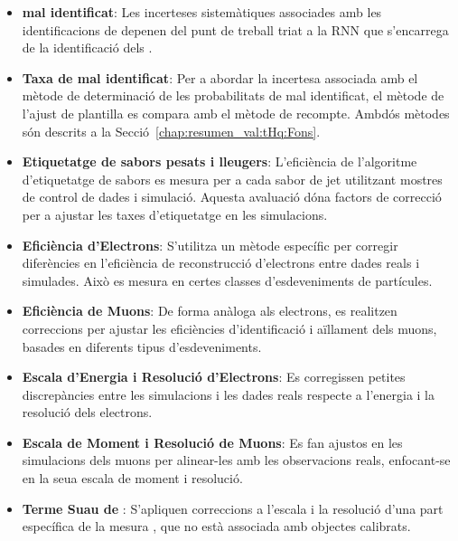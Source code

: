 \begin{itemize}
	\item \textbf{\tauhad mal identificat}: Les incerteses sistemàtiques associades amb les identificacions de \tauhad 
	depenen del punt de treball triat a la RNN que s'encarrega de la identificació dels \tauhad.%


	\item \textbf{Taxa de \tauhad mal identificat}: Per a abordar la incertesa associada amb el mètode
	de determinació de les probabilitats de \tauhad mal identificat, el mètode de l'ajust de plantilla es
	compara amb el mètode de recompte. Ambdós mètodes són descrits a la Secció~\ref{chap:resumen_val:tHq:Fons}.
	
	\item \textbf{Etiquetatge de sabors pesats i lleugers}: L'eficiència de l'algoritme d'etiquetatge de sabors es
	mesura per a cada sabor de jet utilitzant mostres de control de dades i simulació. Aquesta avaluació
	dóna factors de correcció per a ajustar les taxes d'etiquetatge en les simulacions. 
	
	\item \textbf{Eficiència d'Electrons}: S'utilitza un mètode específic per corregir diferències en l'eficiència 
	de reconstrucció d'electrons entre dades reals i simulades. Això es mesura en certes classes d'esdeveniments de partícules.

	\item \textbf{Eficiència de Muons}: De forma anàloga als electrons, es realitzen correccions per ajustar les eficiències
	d'identificació i aïllament dels muons, basades en diferents tipus d'esdeveniments.

	\item \textbf{Escala d'Energia i Resolució d'Electrons}: Es corregissen petites discrepàncies entre les simulacions i 
	les dades reals respecte a l'energia i la resolució dels electrons.

	\item \textbf{Escala de Moment i Resolució de Muons}: Es fan ajustos en les simulacions dels muons per alinear-les amb
	les observacions reals, enfocant-se en la seua escala de moment i resolució.

	\item \textbf{Terme Suau de \MET}: S'apliquen correccions a l'escala i la resolució d'una part específica de la mesura 
	\met, que no està associada amb objectes calibrats.	
\end{itemize}


